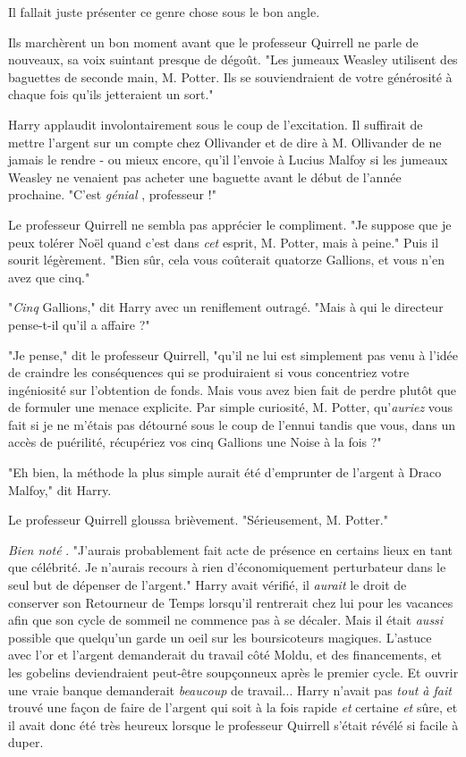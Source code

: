 Il fallait juste présenter ce genre chose sous le bon angle.

Ils marchèrent un bon moment avant que le professeur Quirrell ne parle de nouveaux, sa voix suintant presque de dégoût. "Les jumeaux Weasley utilisent des baguettes de seconde main, M. Potter. Ils se souviendraient de votre générosité à chaque fois qu'ils jetteraient un sort."

Harry applaudit involontairement sous le coup de l'excitation. Il suffirait de mettre l'argent sur un compte chez Ollivander et de dire à M. Ollivander de ne jamais le rendre - ou mieux encore, qu'il l'envoie à Lucius Malfoy si les jumeaux Weasley ne venaient pas acheter une baguette avant le début de l'année prochaine. "C'est \emph{génial} , professeur !"

Le professeur Quirrell ne sembla pas apprécier le compliment. "Je suppose que je peux tolérer Noël quand c'est dans \emph{cet}  esprit, M. Potter, mais à peine." Puis il sourit légèrement. "Bien sûr, cela vous coûterait quatorze Gallions, et vous n'en avez que cinq."

"\emph{Cinq}  Gallions," dit Harry avec un reniflement outragé. "Mais à qui le directeur pense-t-il qu'il a affaire ?"

"Je pense," dit le professeur Quirrell, "qu'il ne lui est simplement pas venu à l'idée de craindre les conséquences qui se produiraient si vous concentriez votre ingéniosité sur l'obtention de fonds. Mais vous avez bien fait de perdre plutôt que de formuler une menace explicite. Par simple curiosité, M. Potter, qu'\emph{auriez}  vous fait si je ne m'étais pas détourné sous le coup de l'ennui tandis que vous, dans un accès de puérilité, récupériez vos cinq Gallions une Noise à la fois ?"

"Eh bien, la méthode la plus simple aurait été d'emprunter de l'argent à Draco Malfoy," dit Harry.

Le professeur Quirrell gloussa brièvement. "Sérieusement, M. Potter."

\emph{Bien noté} . "J'aurais probablement fait acte de présence en certains lieux en tant que célébrité. Je n'aurais recours à rien d'économiquement perturbateur dans le seul but de dépenser de l'argent." Harry avait vérifié, il \emph{aurait}  le droit de conserver son Retourneur de Temps lorsqu'il rentrerait chez lui pour les vacances afin que son cycle de sommeil ne commence pas à se décaler. Mais il était \emph{aussi}  possible que quelqu'un garde un oeil sur les boursicoteurs magiques. L'astuce avec l'or et l'argent demanderait du travail côté Moldu, et des financements, et les gobelins deviendraient peut-être soupçonneux après le premier cycle. Et ouvrir une vraie banque demanderait \emph{beaucoup}  de travail... Harry n'avait pas \emph{tout à fait}  trouvé une façon de faire de l'argent qui soit à la fois rapide \emph{et}  certaine \emph{et } sûre, et il avait donc été très heureux lorsque le professeur Quirrell s'était révélé si facile à duper.

